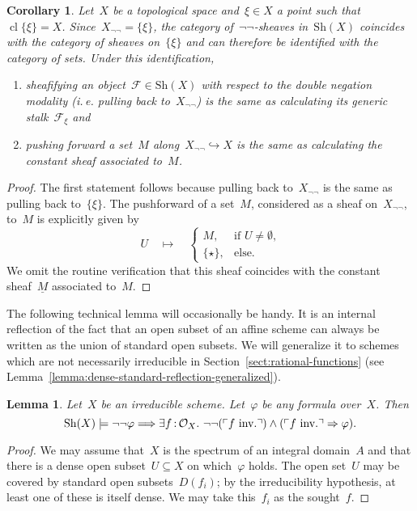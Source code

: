 \documentclass[10pt]{amsart}
\makeatletter
\theoremstyle{definition}
\theoremstyle{plain}
\newtheorem{cor}[defn]{Corollary}
\newtheorem{lemma}[defn]{Lemma}
\theoremstyle{remark}
\newcommand{\F}{\mathcal{F}}
\renewcommand{\O}{\mathcal{O}}
\newcommand{\Sh}{\mathrm{Sh}}
\DeclareMathOperator{\Clos}{cl}
\newcommand{\?}{\,{:}\,}
\renewcommand{\_}{\mathpunct{.}\,}
\newcommand{\speak}[1]{\ulcorner\text{\textnormal{#1}}\urcorner}
\newcommand{\ie}{i.\,e.\@\xspace}
\newcommand{\inv}{inv.\@}
\makeatother
\begin{document}
\begin{cor}\label{cor:negneg-generic-point-pushpull}
Let~$X$ be a topological space and~$\xi \in X$ a point such
that~$\Clos\{\xi\} = X$. Since~$X_{\neg\neg} = \{\xi\}$, the
category of~$\neg\neg$-sheaves in~$\Sh(X)$ coincides with the category of
sheaves on~$\{\xi\}$ and can therefore be identified with the category of sets.
Under this identification,
\begin{enumerate}
\item sheafifying an object~$\F \in \Sh(X)$ with respect
to the double negation modality (\ie pulling back to~$X_{\neg\neg}$) is the
same as calculating its generic stalk~$\F_\xi$ and
\item pushing forward a set~$M$ along~$X_{\neg\neg} \hookrightarrow X$ is the
same as calculating the constant sheaf associated to~$M$.
\end{enumerate}
\end{cor}
\begin{proof}The first statement follows because pulling back to~$X_{\neg\neg}$
is the same as pulling back to~$\{\xi\}$. The pushforward of a set~$M$,
considered as a sheaf on~$X_{\neg\neg}$, to~$M$ is explicitly given by
\[ U \quad\longmapsto\quad \begin{cases}
  M, & \text{if $U \neq \emptyset$,} \\
  \{\star\}, & \text{else.}
\end{cases} \]
We omit the routine verification that this sheaf coincides with the constant
sheaf~$\underline{M}$ associated to~$M$.
\end{proof}

The following technical lemma will occasionally be handy. It is an internal
reflection of the fact that an open subset of an affine scheme can always be
written as the union of standard open subsets. We will generalize it
to schemes which are not necessarily irreducible in
Section~\ref{sect:rational-functions} (see
Lemma~\ref{lemma:dense-standard-reflection-generalized}).

\begin{lemma}\label{lemma:dense-standard-reflection}
Let~$X$ be an irreducible scheme. Let~$\varphi$ be any formula
over~$X$. Then
\[ \Sh(X) \models \neg\neg\varphi \Longrightarrow \exists f\?\O_X\_
  \neg\neg(\speak{$f$ \inv}) \wedge (\speak{$f$ \inv} \Rightarrow \varphi). \]
\end{lemma}
\begin{proof}We may assume that~$X$ is the spectrum of an integral domain~$A$
and that there is a dense open subset~$U \subseteq X$ on which~$\varphi$ holds.
The open set~$U$ may be covered by standard open subsets~$D(f_i)$; by the
irreducibility hypothesis, at least one of these is itself
dense. We may take this~$f_i$ as the sought~$f$.
\end{proof}
\end{document}
